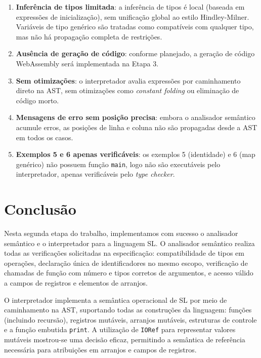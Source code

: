 \documentclass[12pt,a4paper]{article}
\begin{document}
\begin{enumerate}
    \item \textbf{Inferência de tipos limitada}: a inferência de tipos é local (baseada em expressões de inicialização), sem unificação global ao estilo Hindley-Milner. Variáveis de tipo genérico são tratadas como compatíveis com qualquer tipo, mas não há propagação completa de restrições.

    \item \textbf{Ausência de geração de código}: conforme planejado, a geração de código WebAssembly será implementada na Etapa 3.

    \item \textbf{Sem otimizações}: o interpretador avalia expressões por caminhamento direto na AST, sem otimizações como \textit{constant folding} ou eliminação de código morto.

    \item \textbf{Mensagens de erro sem posição precisa}: embora o analisador semântico acumule erros, as posições de linha e coluna não são propagadas desde a AST em todos os casos.

    \item \textbf{Exemplos 5 e 6 apenas verificáveis}: os exemplos 5 (identidade) e 6 (map genérico) não possuem função \texttt{main}, logo não são executáveis pelo interpretador, apenas verificáveis pelo \textit{type checker}.
\end{enumerate}

\section{Conclusão}

Nesta segunda etapa do trabalho, implementamos com sucesso o analisador semântico e o interpretador para a linguagem SL. O analisador semântico realiza todas as verificações solicitadas na especificação: compatibilidade de tipos em operações, declaração única de identificadores no mesmo escopo, verificação de chamadas de função com número e tipos corretos de argumentos, e acesso válido a campos de registros e elementos de arranjos.

O interpretador implementa a semântica operacional de SL por meio de caminhamento na AST, suportando todas as construções da linguagem: funções (incluindo recursão), registros mutáveis, arranjos mutáveis, estruturas de controle e a função embutida \texttt{print}. A utilização de \texttt{IORef} para representar valores mutáveis mostrou-se uma decisão eficaz, permitindo a semântica de referência necessária para atribuições em arranjos e campos de registros.
\end{document}
